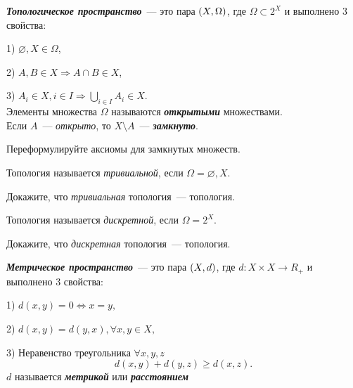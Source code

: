 \documentclass{article}
\begin{document}
    \large

    \setcounter{task_boxed}{0}

    \begin{definition_boxed}
        \textit{\textbf{Топологическое пространство}}~--- это пара $\lr*{X, \Omega}$, где $\Omega \subset 2^X$ и выполнено 3 свойства:

        1) $\varnothing, X \in \Omega$,

        2) $A,B \in X \Rightarrow A \cap B \in X$,

        3) $A_i \in X, i \in I \Rightarrow \bigcup\limits_{i \in I} A_i \in X$.\\
        Элементы множества $\Omega$ называются \textbf{\textit{открытыми}} множествами.\\
        Если $A$~--- \textit{открыто}, то $X \setminus A$~--- \textbf{\textit{замкнуто}}.
    \end{definition_boxed}

    \begin{task_boxed}
        Переформулируйте аксиомы для замкнутых множеств.
    \end{task_boxed}

    \begin{example}
        Топология называется \textit{тривиальной}, если $\Omega = {\varnothing, X}$.
    \end{example}

    \begin{task_boxed}
        Докажите, что \textit{тривиальная} топология~--- топология.
    \end{task_boxed}

    \begin{example}
        Топология называется \textit{дискретной}, если $\Omega = 2^X$.
    \end{example}

    \begin{task_boxed}
        Докажите, что \textit{дискретная} топология~--- топология.
    \end{task_boxed}


    \begin{definition_boxed}
        \textit{\textbf{Метрическое пространство}}~--- это пара $\lr*{X, d}$, где $d : X \times X \rightarrow R_+$ и выполнено 3 свойства:

        1) $d(x, y) = 0 \Leftrightarrow x = y,$

        2) $d(x, y) = d(y, x), \forall x, y \in X,$

        3) Неравенство треугольника $\forall x, y, z$
        \[
            d(x, y) + d(y, z) \geqslant d(x, z).
        \]
        $d$ называется \textbf{\textit{метрикой}} или \textbf{\textit{расстоянием}}
    \end{definition_boxed}
\end{document}
